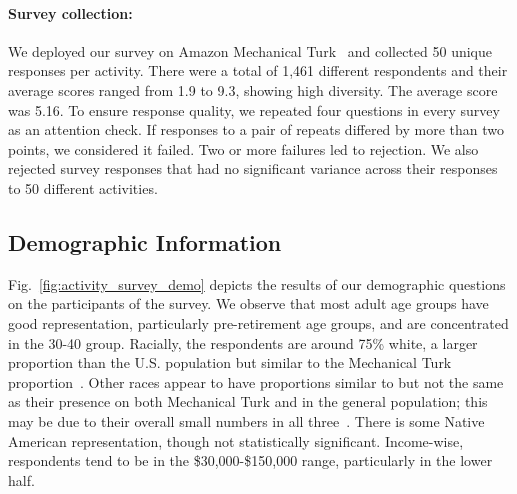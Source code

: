 \paragraph{Survey collection:}
We deployed our survey on Amazon Mechanical Turk~\cite{paolacci2010running} and collected 50 unique responses per activity. There were a total of 1,461 different respondents and their average scores ranged from 1.9 to 9.3, showing high diversity. The average score was 5.16. To ensure response quality, we repeated four questions in every survey as an attention check. If responses to a pair of repeats differed by more than two points, we considered it failed. Two or more failures led to rejection. We also rejected survey responses that had no significant variance across their responses to 50 different activities.


\subsection{Demographic Information}
\label{sec:demographics}

Fig.~\ref{fig:activity_survey_demo} depicts the results of our demographic questions on the participants of the survey. We observe that most adult age groups have good representation, particularly pre-retirement age groups, and are concentrated in the 30-40 group. Racially, the respondents are around 75\% white, a larger proportion than the U.S. population but similar to the Mechanical Turk proportion~\cite{pew2016mturkdemog}. Other races appear to have proportions similar to but not the same as their presence on both Mechanical Turk and in the general population; this may be due to their overall small numbers in all three~\cite{pew2016mturkdemog}. There is some Native American representation, though not statistically significant. Income-wise, respondents tend to be in the \$30,000-\$150,000 range, particularly in the lower half. 

